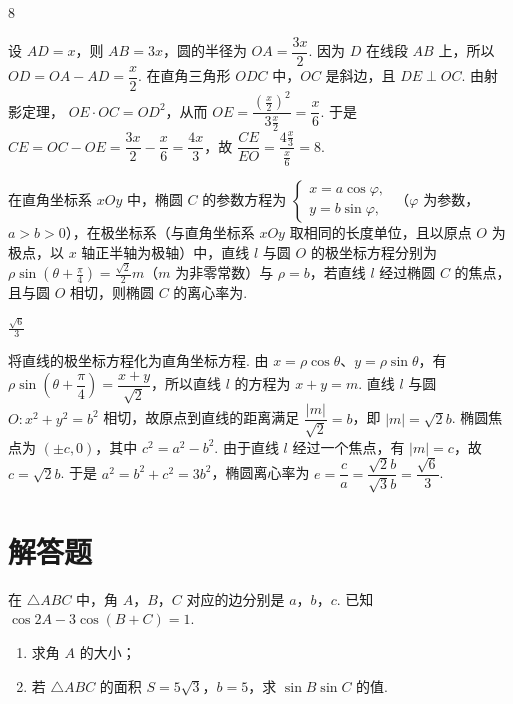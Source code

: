 \begin{answer}
8
\end{answer}

\begin{solution}
设 \(AD=x\)，则 \(AB=3x\)，圆的半径为 \(OA=\dfrac{3x}{2}\). 因为 \(D\) 在线段 \(AB\) 上，所以
\(OD=OA-AD=\dfrac{x}{2}\).
在直角三角形 \(ODC\) 中，\(OC\) 是斜边，且 \(DE\perp OC\). 由射影定理，
\(OE\cdot OC=OD^2\)，从而 \(OE=\dfrac{(\frac{x}{2})^2}{3\frac{x}{2}}=\dfrac{x}{6}\).
于是 \(CE=OC-OE=\dfrac{3x}{2}-\dfrac{x}{6}=\dfrac{4x}{3}\)，故
\(\dfrac{CE}{EO}=\dfrac{4\frac{x}{3}}{\frac{x}{6}}=8\).
\end{solution}

\begin{problem}
在直角坐标系 \(xOy\) 中，椭圆 \(C\) 的参数方程为 \(\begin{cases}
x = a\cos\varphi,\\
y = b\sin\varphi,
\end{cases}\)
（\(\varphi\) 为参数，\(a > b > 0\)），在极坐标系（与直角坐标系 \(xOy\) 取相同的长度单位，且以原点 \(O\) 为极点，以 \(x\) 轴正半轴为极轴）中，直线 \(l\) 与圆 \(O\) 的极坐标方程分别为 \(\rho\sin\left(\theta + \frac{\pi}{4}\right) = \frac{\sqrt{2}}{2}m\)（\(m\) 为非零常数）与 \(\rho = b\)，若直线 \(l\) 经过椭圆 \(C\) 的焦点，且与圆 \(O\) 相切，则椭圆 \(C\) 的离心率为\fillinblank{}.
\end{problem}

\begin{answer}
\(\frac{\sqrt{6}}{3}\)
\end{answer}

\begin{solution}
将直线的极坐标方程化为直角坐标方程. 由 \(x=\rho\cos\theta\)、\(y=\rho\sin\theta\)，有
\(\rho\sin\left(\theta+\dfrac{\pi}{4}\right)=\dfrac{x+y}{\sqrt{2}}\)，所以直线 \(l\) 的方程为 \(x+y=m\).
直线 \(l\) 与圆 \(O: x^2+y^2=b^2\) 相切，故原点到直线的距离满足 \(\dfrac{|m|}{\sqrt{2}}=b\)，即 \(|m|=\sqrt{2}b\).
椭圆焦点为 \((\pm c,0)\)，其中 \(c^2=a^2-b^2\). 由于直线 \(l\) 经过一个焦点，有 \(|m|=c\)，故 \(c=\sqrt{2}b\). 于是 \(a^2=b^2+c^2=3b^2\)，椭圆离心率为
\(e=\dfrac{c}{a}=\dfrac{\sqrt{2}b}{\sqrt{3}b}=\dfrac{\sqrt{6}}{3}\).
\end{solution}

\section{解答题}

\begin{problem}
在 \(\triangle ABC\) 中，角 \(A\)，\(B\)，\(C\) 对应的边分别是 \(a\)，\(b\)，\(c\). 已知 \(\cos 2A - 3\cos (B + C) = 1\).
\begin{enumerate}
\item 求角 \(A\) 的大小；
\item 若 \(\triangle ABC\) 的面积 \(S = 5\sqrt{3}\)，\(b = 5\)，求 \(\sin B \sin C\) 的值.
\end{enumerate}
\end{problem}

